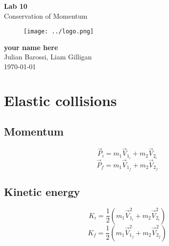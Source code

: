 \documentclass[11pt, letterpaper, includehead]{article}
\begin{document}
\begin{titlepage}
  \begin{center}
    \Huge{\textbf{Lab 10}}\\
    \Huge{Conservation of Momentum}
    \vfill
    \begin{figure}[H] %
      \centering 
      \texttt{[image: ../logo.png]}
    \end{figure}
    \large{\textbf{your name here}}\\
    \large{Julian Barossi, Liam Gilligan}\\
    \vspace{0.5cm}
    \normalsize
    \today
  \end{center}
\end{titlepage}

\tableofcontents
\pagebreak %


\section{Elastic collisions} 
\subsection{Momentum}
$$\vec{P}_i = m_1\vec{V}_{1_i} + m_2\vec{V}_{2_i}$$
$$\vec{P}_f = m_1\vec{V}_{1_f} + m_2\vec{V}_{2_f}$$

\subsection{Kinetic energy}
$$K_i = \frac{1}{2}(m_1 \vec{V}_{1_i}^2 + m_2 \vec{V}_{2_i}^2)$$
$$K_f = \frac{1}{2}(m_1 \vec{V}_{1_f}^2 + m_2 \vec{V}_{2_f}^2)$$

\end{document}
